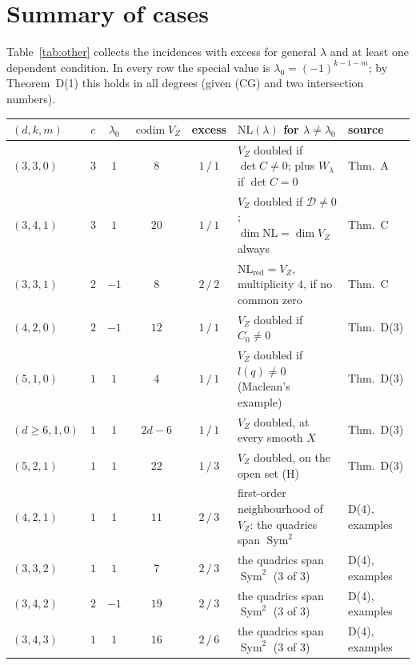 \documentclass[10pt]{article}
\numberwithin{equation}{section}
\theoremstyle{remark}
\newcommand{\NL}{\mathrm{NL}}
\newcommand{\VZ}{V_Z}
\newcommand{\cD}{\mathcal{D}}
\newcommand{\codim}{\operatorname{codim}}
\newcommand{\rg}{\raggedright}
\begin{document}
\section{Summary of cases}\label{sec:other}
Table~\ref{tab:other} collects the incidences with excess for general $\lambda$ and at least one dependent
condition. In every row the special value is $\lambda_0=(-1)^{k-1-m}$; by Theorem~D(1) this holds in all
degrees (given (CG) and two intersection numbers).

\begin{table}[t]
\centering\footnotesize\setlength{\tabcolsep}{4pt}
\begin{tabular}{@{}lccccp{}l@{}}
\toprule
$(d,k,m)$ & $c$ & $\lambda_0$ & $\codim\VZ$ & excess & $\NL(\lambda)$ for $\lambda\ne\lambda_0$ & source\\
\midrule
$(3,3,0)$ & $3$ & $1$ & $8$ & $1\,/\,1$ & \rg $\VZ$ doubled if $\det C\ne0$; plus $W_\lambda$ if $\det C=0$ & Thm.~A\\
$(3,4,1)$ & $3$ & $1$ & $20$ & $1\,/\,1$ & \rg $\VZ$ doubled if $\cD\ne0$; $\dim\NL=\dim\VZ$ always & Thm.~C\\
$(3,3,1)$ & $2$ & $-1$ & $8$ & $2\,/\,2$ & \rg $\NL_{\mathrm{red}}=\VZ$, multiplicity $4$, if no common zero & Thm.~C\\
$(4,2,0)$ & $2$ & $-1$ & $12$ & $1\,/\,1$ & \rg $\VZ$ doubled if $C_0\ne0$ & Thm.~D(3)\\
$(5,1,0)$ & $1$ & $1$ & $4$ & $1\,/\,1$ & \rg $\VZ$ doubled if $l(q)\ne0$ (Maclean's example) & Thm.~D(3)\\
$(d\ge6,1,0)$ & $1$ & $1$ & $2d-6$ & $1\,/\,1$ & \rg $\VZ$ doubled, at every smooth $X$ & Thm.~D(3)\\
$(5,2,1)$ & $1$ & $1$ & $22$ & $1\,/\,3$ & \rg $\VZ$ doubled, on the open set (H) & Thm.~D(3)\\
$(4,2,1)$ & $1$ & $1$ & $11$ & $2\,/\,3$ & \rg first-order neighbourhood of $\VZ$: the quadrics span $\operatorname{Sym}^2$ & D(4), examples\\
$(3,3,2)$ & $1$ & $1$ & $7$ & $2\,/\,3$ & \rg the quadrics span $\operatorname{Sym}^2$ ($3$ of $3$) & D(4), examples\\
$(3,4,2)$ & $2$ & $-1$ & $19$ & $2\,/\,3$ & \rg the quadrics span $\operatorname{Sym}^2$ ($3$ of $3$) & D(4), examples\\
$(3,4,3)$ & $1$ & $1$ & $16$ & $2\,/\,6$ & \rg the quadrics span $\operatorname{Sym}^2$ ($3$ of $3$) & D(4), examples\\
\bottomrule
\end{tabular}

\end{table}
\end{document}
